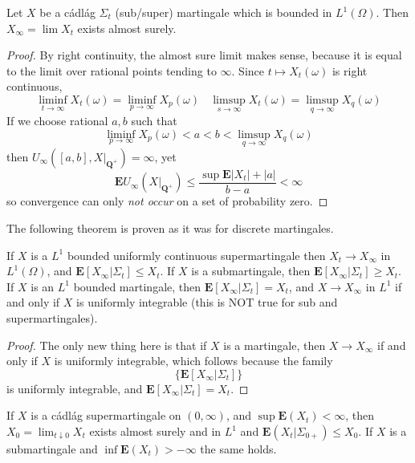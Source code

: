 \begin{theorem}
    Let $X$ be a c\'{a}dl\'{a}g $\Sigma_t$ (sub/super) martingale which is bounded in $L^1(\Omega)$. Then $X_\infty = \lim X_t$ exists almost surely.
\end{theorem}
\begin{proof}
    By right continuity, the almost sure limit makes sense, because it is equal to the limit over rational points tending to $\infty$. Since $t \mapsto X_t(\omega)$ is right continuous,
    \[ \liminf_{t \to \infty} X_t(\omega) = \liminf_{p \to \infty} X_p(\omega)\ \ \ \ \limsup_{s \to \infty} X_t(\omega) = \limsup_{q \to \infty} X_q(\omega) \]
    If we choose rational $a,b$ such that
    \[ \liminf_{p \to \infty} X_p(\omega) < a < b < \limsup_{q \to \infty} X_q(\omega) \]
    then $U_\infty([a,b], X|_{\mathbf{Q}^+}) = \infty$, yet
    \[ \mathbf{E} U_\infty(X|_{\mathbf{Q}^+}) \leq \frac{\sup \mathbf{E}|X_t| + |a|}{b-a} < \infty \]
    so convergence can only {\it not occur} on a set of probability zero.
\end{proof}

The following theorem is proven as it was for discrete martingales.

\begin{theorem}
    If $X$ is a $L^1$ bounded uniformly continuous supermartingale then $X_t \to X_\infty$ in $L^1(\Omega)$, and $\mathbf{E}[X_\infty|\Sigma_t] \leq X_t$. If $X$ is a submartingale, then $\mathbf{E}[X_\infty|\Sigma_t] \geq X_t$. If $X$ is an $L^1$ bounded martingale, then $\mathbf{E}[X_\infty|\Sigma_t] = X_t$, and $X \to X_\infty$ in $L^1$ if and only if $X$ is uniformly integrable (this is NOT true for sub and supermartingales).
\end{theorem}
\begin{proof}
    The only new thing here is that if $X$ is a martingale, then $X \to X_\infty$ if and only if $X$ is uniformly integrable, which follows because the family
    \[ \{ \mathbf{E}[X_\infty|\Sigma_t] \} \]
    is uniformly integrable, and $\mathbf{E}[X_\infty|\Sigma_t] = X_t$.
\end{proof}

\begin{theorem}
    If $X$ is a c\'{a}dl\'{a}g supermartingale on $(0,\infty)$, and $\sup \mathbf{E}(X_t) < \infty$, then $X_0 = \lim_{t \downarrow 0} X_t$ exists almost surely and in $L^1$ and $\mathbf{E}(X_t|\Sigma_{0+}) \leq X_0$. If $X$ is a submartingale and $\inf \mathbf{E}(X_t) > -\infty$ the same holds.
\end{theorem}


